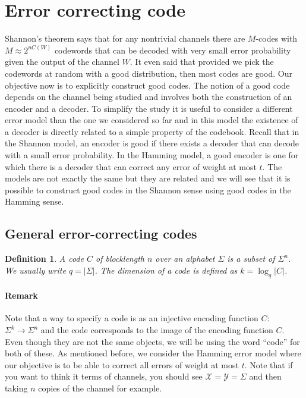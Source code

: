 \documentclass{article}
\newtheorem{defi}{Definition}
\begin{document}
\section{Error correcting code}
Shannon’s theorem says that for any nontrivial channels there are $M$-codes with $M \approx 2^{nC(W)}$
codewords that can be decoded with very small error probability given the output of the channel $W$. It even said that provided we pick the codewords at random with a good distribution, then most
codes are good. Our objective now is to explicitly construct good codes. The notion of a good code depends on the channel being studied and involves both the construction of an encoder and a decoder. To simplify the study it is useful to consider a different error model than the one we considered so far and in this model the existence of a decoder is directly related to a simple property of the codebook. Recall that in the Shannon model, an encoder is good if there exists a decoder that can decode with a small error probability. In the Hamming
model, a good encoder is one for which there is a decoder that can correct any error of weight at most $t$. The models are not exactly the same but they are related and we will see that it is possible to construct good codes in the Shannon sense using good codes in the Hamming sense.

\subsection{General error-correcting codes}
\begin{defi}
A code $C$ of blocklength $n$ over an alphabet $\Sigma$ is a subset of $\Sigma^n$. We usually write $q = |\Sigma|$.
The dimension of a code is defined as $k = \log_q |C|$.
\end{defi}


\paragraph{Remark} Note that a way to specify a code is as an injective encoding function $C$: $\Sigma^k \to \Sigma^n$ and the code corresponds to the image of the encoding function $C$. Even though they are not the same objects, we will be using the word “code” for both of these.
As mentioned before, we consider the Hamming error model where our objective is to be able to correct all errors of weight at most $t$. Note that if you want to think it terms of channels, you should see $\mathcal{X} = \mathcal{Y} = \Sigma$ and then taking $n$ copies of the channel for example.
\end{document}
